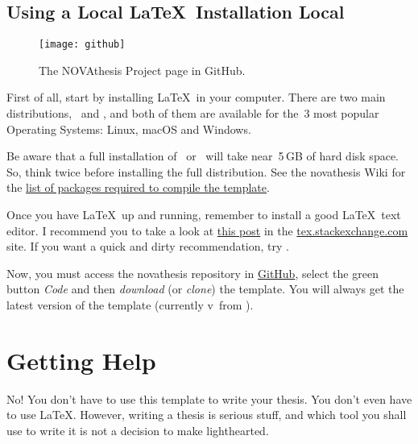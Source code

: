 \subsection{Using a Local \LaTeX\ Installation Local}
\label{sub:using_local_latex}


\begin{wrapfigure}{r}{0.3\linewidth}
\vspace*{-17ex}
\texttt{[image: github]}%
\caption{The NOVAthesis Project page in GitHub.}
\label{fig:github2}
\end{wrapfigure}

First of all, start by installing \LaTeX\ in your computer.  There are two main distributions, \href{https://miktex.org}{\ntindex{\MikTeX}}\ and \href{https://www.tug.org/texlive/}{\ntindex{\TeXLive}}, and both of them are available for the~3 most popular Operating Systems: Linux, macOS and Windows.

Be aware that a full installation of \MikTeX\ or \TeXLive\ will take near~5\,GB of hard disk space.  So, think twice before installing the full distribution.  See the \gls{novathesis} Wiki for the \href{https://github.com/joaomlourenco/novathesis/wiki/installing-latex#minimal-installation-in-any-of-the-systems-above}{list of packages required to compile the template}.

Once you have \LaTeX\ up and running, remember to install a good \LaTeX\ text editor.  I recommend you to take a look at  \href{https://tex.stackexchange.com/questions/339/latex-editors-ides}{this post} in the \url{tex.stackexchange.com} site.  If you want a quick and dirty recommendation, try \href{https://www.texstudio.org/}{}.

Now, you must access the \gls{novathesis} repository in \href{https://github.com/joaomlourenco/novathesis}{GitHub}, select the green button \emph{Code} and then \emph{download} (or \emph{clone}) the template.  You will always get the latest version of the template (currently v\novathesisversion\ from \novathesisdate).


\section{Getting Help}
\label{sec:getting_help}

\ntindex[Help]{}

No! You don't have to use this template to write your thesis.  You don't even have to use \LaTeX.  However, writing a thesis is serious stuff, and which tool you shall use to write it is not a decision to make lighthearted.

